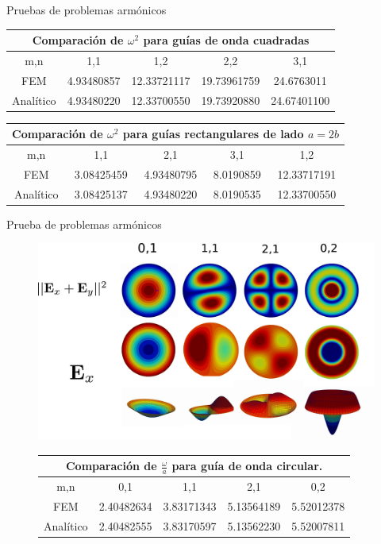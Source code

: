 \documentclass[xcolor=table,serif,handout]{beamer}
\begin{document}
	\begin{frame}{Pruebas de problemas armónicos}
		\begin{center}
		\begin{tabular}{|c|c|c|c|c|}
		\hline
		\multicolumn{5}{|c|}{Comparación de $\omega^2$ para guías de onda cuadradas} \\
		\hline 
		m,n & 1,1 & 1,2 & 2,2 & 3,1 \\ 
		\hline 
		FEM & 4.93480857 & 12.33721117 & 19.73961759 & 24.6763011 \\ 
		\hline 
		Analítico & 4.93480220 & 12.33700550 & 19.73920880 & 24.67401100 \\ 
		\hline 
		\end{tabular} 
		\end{center}
		\begin{center}
	\begin{tabular}{|c|c|c|c|c|}
	\hline
	\multicolumn{5}{|c|}{Comparación de $\omega^2$ para guías rectangulares de lado $a =2b$} \\
	\hline 
	m,n & 1,1 & 2,1 & 3,1 & 1,2 \\ 
	\hline 
	FEM     & 3.08425459 & 4.93480795 & 8.0190859 & 12.33717191 \\ 
	\hline 
	Analítico & 3.08425137 & 4.93480220 & 8.0190535 & 12.33700550 \\ 
	\hline 
	\end{tabular} 
	\end{center}
	\end{frame}
	\begin{frame}{Prueba de problemas armónicos}
	\begin{figure}
\centering
\includegraphics[scale=0.07]{circular_waveguide.eps}
\small
\begin{center}
\begin{tabular}{|c|c|c|c|c|}
\hline
\multicolumn{5}{|c|}{Comparación de $\frac{\omega}{a}$ para guía de onda circular.} \\
\hline 
m,n & 0,1 & 1,1 & 2,1 & 0,2 \\ 
\hline 
FEM     & 2.40482634 & 3.83171343 & 5.13564189 & 5.52012378 \\ 
\hline 
Analítico & 2.40482555 & 3.83170597 & 5.13562230 & 5.52007811 \\ 
\hline 
\end{tabular} 
\end{center}
\end{figure}	
	\end{frame}
\end{document}
